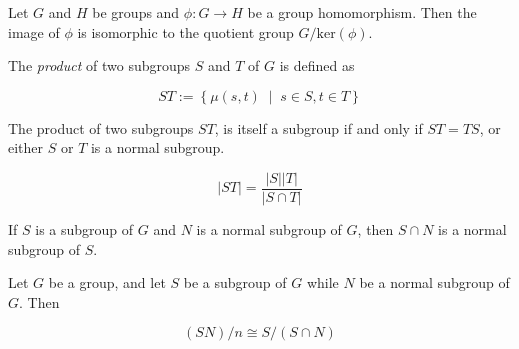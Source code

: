 \begin{theorem}
    \label{theorem : image_homomorphism_iso_quot_ker}
    Let $G$ and $H$ be groups and $\phi : G \rightarrow H$ be a group
    homomorphism. Then the image of $\phi$ is isomorphic to the quotient group
    $G/\text{ker}(\phi)$.
\end{theorem}

\begin{definition}
    \label{definition : Subgroup.op}
    The \emph{product} of two subgroups $S$ and $T$ of $G$ is defined as

    \begin{equation*}
        ST := \left\{ \mu(s, t) \;\middle|\; s \in S, t \in T \right\}
    \end{equation*}
\end{definition}

\begin{theorem}
    \label{theorem : Subgroup.op_subgroup}
    The product of two subgroups $ST$, is itself a subgroup if and only if $ST =
    TS$, or either $S$ or $T$ is a normal subgroup.
\end{theorem}

\begin{theorem}
    \label{theorem : Subgroup.op_card}
    \begin{equation*}
        |ST| = \frac{|S||T|}{|S \cap T|}
    \end{equation*}
\end{theorem}

\begin{theorem}
    \label{theorem : Intersect_normal_of_normal}
    If $S$ is a subgroup of $G$ and $N$ is a normal subgroup of $G$, then $S
    \cap N$ is a normal subgroup of $S$.
\end{theorem}

\begin{theorem}
    \label{theorem : prod_mod_normal_iso_mod_inter_normal}

    Let $G$ be a group, and let $S$ be a subgroup of $G$ while $N$ be a
    normal subgroup of $G$. Then

    \begin{equation*}
        (SN) / n \cong S/(S \cap N)
    \end{equation*}
\end{theorem}

